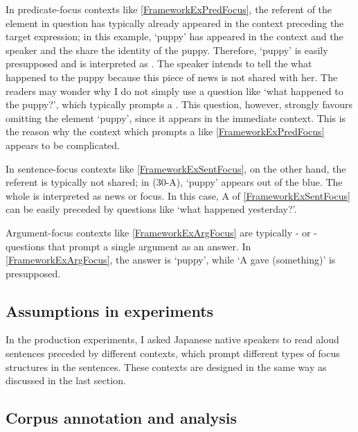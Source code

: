 In predicate-focus contexts like \ref{FrameworkExPredFocus},
the referent of the  element in question has typically already appeared in the context preceding the target expression;
in this example,
 `puppy' has appeared in the context and the speaker and the  share the identity of the puppy.
Therefore,
 `puppy' is easily presupposed and is interpreted as .
The speaker intends to tell the  what happened to the puppy
because this piece of news is not shared with her.
The readers may wonder
why I do not simply use a question like `what happened to the puppy?',
which typically prompts a .
This question, however,
strongly favours omitting the element  `puppy', since it appears in the immediate context.
This is the reason why the context which prompts a  like \ref{FrameworkExPredFocus} appears to be complicated.

In sentence-focus contexts like \ref{FrameworkExSentFocus},
on the other hand, the referent is typically not shared;
in (30-A),
 `puppy' appears out of the blue.
The whole  is interpreted as news or focus.
In this case, A of \ref{FrameworkExSentFocus} can be easily preceded by
questions like `what happened yesterday?'.

Argument-focus contexts like \ref{FrameworkExArgFocus}
are typically - or -questions
that prompt a single argument as an answer.
In \ref{FrameworkExArgFocus},
the answer is  `puppy', while
`A gave (something)' is presupposed.


\subsection{Assumptions in experiments}

In the production experiments,
I asked Japanese native speakers to read aloud sentences preceded by different contexts, which prompt different types of focus structures in the sentences.
These contexts
are designed in the same way as discussed in the last section.

\subsection{Corpus annotation and analysis}\label{FrameworkCorpus}


